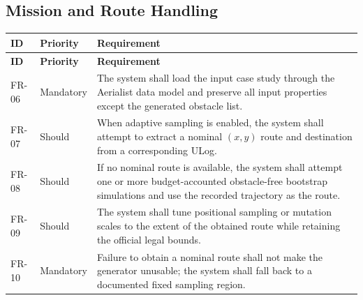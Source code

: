 \documentclass[11pt,a4paper,openany]{report}
\begin{document}
\subsection{Mission and Route Handling}
\begin{longtable}{L{1.7cm} L{2.1cm} L{10.8cm}}
\toprule
\textbf{ID} & \textbf{Priority} & \textbf{Requirement}\\
\midrule
\endfirsthead
\toprule
\textbf{ID} & \textbf{Priority} & \textbf{Requirement}\\
\midrule
\endhead
FR-06 & Mandatory & The system shall load the input case study through the Aerialist data model and preserve all input properties except the generated obstacle list.\\
FR-07 & Should & When adaptive sampling is enabled, the system shall attempt to extract a nominal $(x,y)$ route and destination from a corresponding ULog.\\
FR-08 & Should & If no nominal route is available, the system shall attempt one or more budget-accounted obstacle-free bootstrap simulations and use the recorded trajectory as the route.\\
FR-09 & Should & The system shall tune positional sampling or mutation scales to the extent of the obtained route while retaining the official legal bounds.\\
FR-10 & Mandatory & Failure to obtain a nominal route shall not make the generator unusable; the system shall fall back to a documented fixed sampling region.\\
\bottomrule
\end{longtable}
\end{document}
